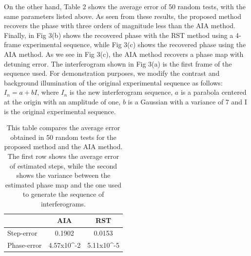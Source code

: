 \documentclass[letterpaper,12pt]{article}   %
\begin{document}
On the other hand, Table 2 shows the average error of 50 random tests, with the same 
parameters listed above. As seen from these results, the proposed method recovers the
phase with three orders of magnitude less than the AIA method.
Finally, in Fig 3(b) shows the recovered phase with the RST method using a 4-frame
experimental sequence, while Fig 3(c) shows the recovered phase using the AIA method. As we 
 see in Fig 3(c), the AIA method recovers a phase map with detuning error.
The interferogram shown in Fig 3(a) is the first frame of the sequence used. For 
demonstration purposes, we modify the contrast and background illumination of the original 
experimental sequence as follows: $I_n=a+bI$, where $I_n$ is the new interferogram 
sequence, $a$ is a parabola centered at the origin with an amplitude of one, $b$ is a Gaussian with a variance of 7 and I is the original experimental sequence.
\begin{table}
	\begin{center}
		\begin{tabular}{|l|c|c|}
		\hline
		            & AIA    & RST 	    \\ \hline \hline
		Step-error  & 0.1902 & 0.0153	\\ \hline
		Phase-error & 4.57x10^{-2} & 5.11x10^{-5} \\ \hline
		\end{tabular}
	\end{center}
	\caption{This table compares the average error obtained in 50 random tests for the
	proposed method and the AIA method. The first row shows the average error of
	estimated steps, while the second shows the variance between the estimated phase map
	and the one used to generate the sequence of interferograms.} 
	\label{Tab:mean-phase_error}
\end{table}
\end{document}
